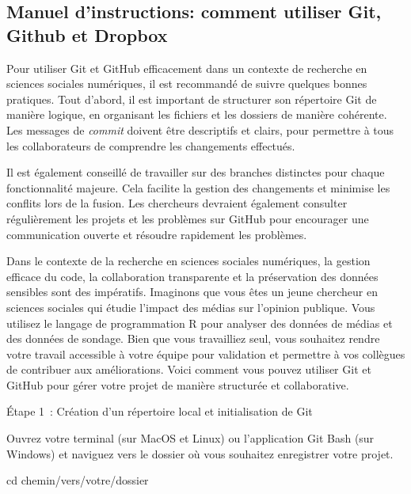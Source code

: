 \documentclass[
  letterpaper,
  DIV=11,
  numbers=noendperiod]{scrreprt}
\newenvironment{Shaded}{\begin{snugshade}}{\end{snugshade}}
\newcommand{\BuiltInTok}[1]{\textcolor[rgb]{0.00,0.23,0.31}{#1}}
\newcommand{\NormalTok}[1]{\textcolor[rgb]{0.00,0.23,0.31}{#1}}
\begin{document}
\hypertarget{manuel-dinstructions-comment-utiliser-git-github-et-dropbox}{%
\subsection{Manuel d'instructions: comment utiliser Git, Github et
Dropbox}\label{manuel-dinstructions-comment-utiliser-git-github-et-dropbox}}

Pour utiliser Git et GitHub efficacement dans un contexte de recherche
en sciences sociales numériques, il est recommandé de suivre quelques
bonnes pratiques. Tout d'abord, il est important de structurer son
répertoire Git de manière logique, en organisant les fichiers et les
dossiers de manière cohérente. Les messages de \emph{commit} doivent
être descriptifs et clairs, pour permettre à tous les collaborateurs de
comprendre les changements effectués.

Il est également conseillé de travailler sur des branches distinctes
pour chaque fonctionnalité majeure. Cela facilite la gestion des
changements et minimise les conflits lors de la fusion. Les chercheurs
devraient également consulter régulièrement les projets et les problèmes
sur GitHub pour encourager une communication ouverte et résoudre
rapidement les problèmes.

Dans le contexte de la recherche en sciences sociales numériques, la
gestion efficace du code, la collaboration transparente et la
préservation des données sensibles sont des impératifs. Imaginons que
vous êtes un jeune chercheur en sciences sociales qui étudie l'impact
des médias sur l'opinion publique. Vous utilisez le langage de
programmation R pour analyser des données de médias et des données de
sondage. Bien que vous travailliez seul, vous souhaitez rendre votre
travail accessible à votre équipe pour validation et permettre à vos
collègues de contribuer aux améliorations. Voici comment vous pouvez
utiliser Git et GitHub pour gérer votre projet de manière structurée et
collaborative.

Étape 1~: Création d'un répertoire local et initialisation de Git

Ouvrez votre terminal (sur MacOS et Linux) ou l'application Git Bash
(sur Windows) et naviguez vers le dossier où vous souhaitez enregistrer
votre projet.

\begin{Shaded}
\begin{Highlighting}[]
\BuiltInTok{cd}\NormalTok{ chemin/vers/votre/dossier}
\end{Highlighting}
\end{Shaded}
\end{document}
